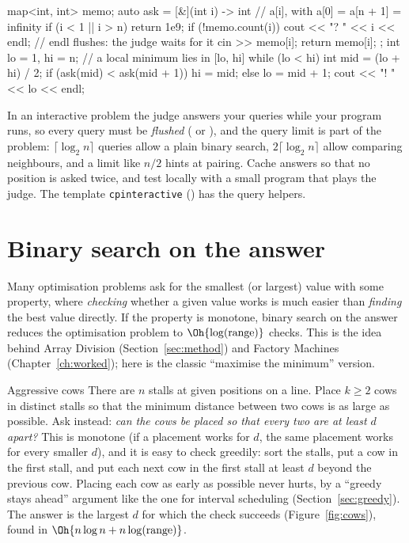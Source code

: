 \begin{code}
map<int, int> memo;
auto ask = [&](int i) -> int {  // a[i], with a[0] = a[n + 1] = infinity
    if (i < 1 || i > n) return 1e9;
    if (!memo.count(i)) {
        cout << "? " << i << endl;  // endl flushes: the judge waits for it
        cin >> memo[i];
    }
    return memo[i];
};
int lo = 1, hi = n;  // a local minimum lies in [lo, hi]
while (lo < hi) {
    int mid = (lo + hi) / 2;
    if (ask(mid) < ask(mid + 1)) hi = mid;
    else lo = mid + 1;
}
cout << "! " << lo << endl;
\end{code}

\begin{tip}
In an interactive problem the judge answers your queries while your program runs, so every query must be \emph{flushed}
( or ), and the query limit is part of the problem: $\lceil \log_2 n \rceil$ queries allow a plain
binary search, $2\lceil \log_2 n\rceil$ allow comparing neighbours, and a limit like $n/2$ hints at pairing. Cache answers so
that no position is asked twice, and test locally with a small program that plays the judge. The template
\texttt{cpinteractive} () has the query helpers.
\end{tip}

\section[Binary search on the answer]{Binary search on the answer \hfill \silver}\label{sec:bsearch-answer}

Many optimisation problems ask for the smallest (or largest) value with some property, where \emph{checking} whether a given
value works is much easier than \emph{finding} the best value directly. If the property is monotone, binary search on the
answer reduces the optimisation problem to $\Oh{\log(\text{range})}$ checks. This is the idea behind Array Division
(Section~\ref{sec:method}) and Factory Machines (Chapter~\ref{ch:worked}); here is the classic ``maximise the minimum''
version.

\begin{problem}{Aggressive cows}
There are $n$ stalls at given positions on a line. Place $k \ge 2$ cows in distinct stalls so that the minimum distance
between two cows is as large as possible.
\solution Ask instead: \emph{can the cows be placed so that every two are at least $d$ apart?} This is monotone (if a
placement works for $d$, the same placement works for every smaller $d$), and it is easy to check greedily: sort the stalls,
put a cow in the first stall, and put each next cow in the first stall at least $d$ beyond the previous cow. Placing each cow
as early as possible never hurts, by a ``greedy stays ahead'' argument like the one for interval scheduling
(Section~\ref{sec:greedy}). The answer is the largest $d$ for which the check succeeds (Figure~\ref{fig:cows}), found in
$\Oh{n \log n + n \log(\text{range})}$.
\end{problem}

